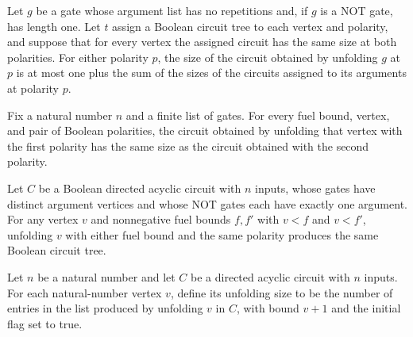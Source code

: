\begin{theorem}
\label{BoolCircuit.size_unfoldGate_le}
\leanok
{}
Let $g$ be a gate whose argument list has no repetitions and, if $g$ is a NOT gate, has
length one. Let $t$ assign a Boolean circuit tree to each vertex and polarity, and
suppose that for every vertex the assigned circuit has the same size at both polarities.
For either polarity $p$, the size of the circuit obtained by unfolding $g$ at $p$ is at
most one plus the sum of the sizes of the circuits assigned to its arguments at polarity
$p$.
\end{theorem}

\begin{theorem}
\label{BoolCircuit.size_unfoldVertex_polarity}
\leanok
{}
Fix a natural number $n$ and a finite list of gates. For every fuel bound, vertex, and
pair of Boolean polarities, the circuit obtained by unfolding that vertex with the first
polarity has the same size as the circuit obtained with the second polarity.
\end{theorem}

\begin{theorem}
\label{BoolCircuit.DAGCircuit.unfoldVertex_fuel_congr}
\leanok
{}
Let $C$ be a Boolean directed acyclic circuit with $n$ inputs, whose gates have distinct
argument vertices and whose NOT gates each have exactly one argument. For any vertex $v$
and nonnegative fuel bounds $f,f'$ with $v<f$ and $v<f'$, unfolding $v$ with either fuel
bound and the same polarity produces the same Boolean circuit tree.
\end{theorem}

\begin{definition}
\label{BoolCircuit.DAGCircuit.unfoldSize}
\leanok
{}
Let $n$ be a natural number and let $C$ be a directed acyclic circuit with $n$ inputs.
For each natural-number vertex $v$, define its unfolding size to be the number of
entries in the list produced by unfolding $v$ in $C$, with bound $v+1$ and the initial
flag set to true.
\end{definition}

